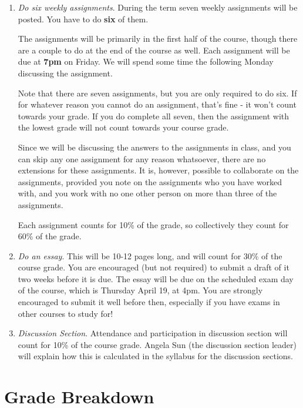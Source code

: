\documentclass[10pt]{article}
\begin{document}
\begin{enumerate}
\item \emph{Do six weekly assignments}. During the term seven weekly assignments will be posted. You have to do \textbf{six} of them. \smallskip

The assignments will be primarily in the first half of the course, though there are a couple to do at the end of the course as well. Each assignment will be due at \textbf{7pm} on Friday. We will spend some time the following Monday discussing the assignment.\smallskip

Note that there are seven assignments, but you are only required to do six. If for whatever reason you cannot do an assignment, that's fine - it won't count towards your grade. If you do complete all seven, then the assignment with the lowest grade will not count towards your course grade. \smallskip

Since we will be discussing the answers to the assignments in class, and you can skip any one assignment for any reason whatsoever, there are no extensions for these assignments. It is, however, possible to collaborate on the assignments, provided you note on the assignments who you have worked with, and you work with no one other person on more than three of the assignments.\smallskip

Each assignment counts for 10\% of the grade, so collectively they count for 60\% of the grade. 

\item \emph{Do an essay}. This will be 10-12 pages long, and will count for 30\% of the course grade. You are encouraged (but not required) to submit a draft of it two weeks before it is due. The essay will be due on the scheduled exam day of the course, which is Thursday April 19, at 4pm. You are strongly encouraged to submit it well before then, especially if you have exams in other courses to study for!

\item \emph{Discussion Section}. Attendance and participation in discussion section will count for 10\% of the course grade. Angela Sun (the discussion section leader) will explain how this is calculated in the syllabus for the discussion sections.

\end{enumerate}

\section*{Grade Breakdown}
\end{document}
